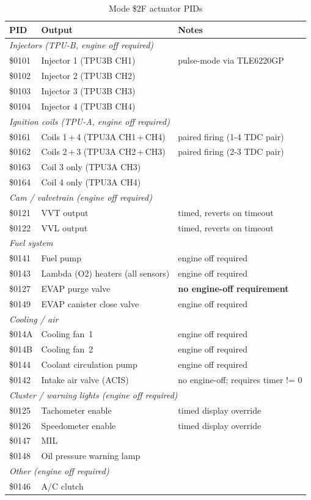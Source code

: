 \documentclass[a4paper,11pt]{article}
\renewcommand{\_}{\oldunderscore\allowbreak}
\begin{document}
\begin{table}[H]
\centering
\begin{tabular}{lll}
\toprule
\textbf{PID} & \textbf{Output} & \textbf{Notes} \\
\midrule
\multicolumn{3}{l}{\textit{Injectors (TPU-B, engine off required)}} \\
\$0101 & Injector 1 (TPU3B CH1) & pulse-mode via TLE6220GP \\
\$0102 & Injector 2 (TPU3B CH2) & \\
\$0103 & Injector 3 (TPU3B CH3) & \\
\$0104 & Injector 4 (TPU3B CH4) & \\
\multicolumn{3}{l}{\textit{Ignition coils (TPU-A, engine off required)}} \\
\$0161 & Coils 1\,+\,4 (TPU3A CH1\,+\,CH4) & paired firing (1-4 TDC pair) \\
\$0162 & Coils 2\,+\,3 (TPU3A CH2\,+\,CH3) & paired firing (2-3 TDC pair) \\
\$0163 & Coil 3 only (TPU3A CH3) & \\
\$0164 & Coil 4 only (TPU3A CH4) & \\
\multicolumn{3}{l}{\textit{Cam / valvetrain (engine off required)}} \\
\$0121 & VVT output & timed, reverts on timeout \\
\$0122 & VVL output & timed, reverts on timeout \\
\multicolumn{3}{l}{\textit{Fuel system}} \\
\$0141 & Fuel pump & engine off required \\
\$0143 & Lambda (O2) heaters (all sensors) & engine off required \\
\$0127 & EVAP purge valve & \textbf{no engine-off requirement} \\
\$0149 & EVAP canister close valve & engine off required \\
\multicolumn{3}{l}{\textit{Cooling / air}} \\
\$014A & Cooling fan~1 & engine off required \\
\$014B & Cooling fan~2 & engine off required \\
\$0144 & Coolant circulation pump & engine off required \\
\$0142 & Intake air valve (ACIS) & no engine-off; requires timer != 0 \\
\multicolumn{3}{l}{\textit{Cluster / warning lights (engine off required)}} \\
\$0125 & Tachometer enable & timed display override \\
\$0126 & Speedometer enable & timed display override \\
\$0147 & MIL & \\
\$0148 & Oil pressure warning lamp & \\
\multicolumn{3}{l}{\textit{Other (engine off required)}} \\
\$0146 & A/C clutch & \\
\bottomrule
\end{tabular}
\caption{Mode \$2F actuator PIDs}\label{tab:mode2f}
\end{table}
\end{document}
